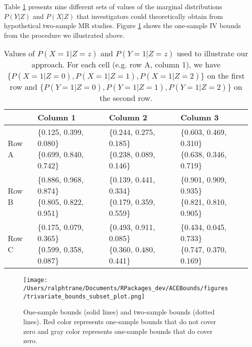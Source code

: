 \documentclass[
]{article}
\theoremstyle{plain}
\begin{document}
Table \ref{tab:subset_plot_summaries} presents nine different sets of values of the marginal distributions \(P(Y | Z)\) and \(P(X | Z)\) that investigators could theoretically obtain from hypothetical two-sample MR studies. Figure \ref{fig:trivariate_bounds} shows the one-sample IV bounds from the procedure we illustrated above.

\begin{table}[H]
  \center
  \caption{Values of $P(X = 1 | Z = z)$ and $P(Y = 1 | Z = z)$ used to illustrate our approach. For each cell (e.g. row A, column 1), we have $\{P(X = 1 | Z = 0), P(X = 1 | Z = 1), P(X = 1 | Z = 2)\}$ on the first row and $\{P(Y = 1 | Z = 0), P(Y = 1 | Z = 1), P(Y = 1 | Z = 2)\}$ on the second row.}
  \label{tab:subset_plot_summaries}
  
\begin{tabular}{llll}
\toprule
  & Column 1 & Column 2 & Column 3\\
\midrule
Row A & \makecell[l]{\{0.125, 0.399, 0.080\}\\\{0.699, 0.840, 0.742\}} & \makecell[c]{\{0.244, 0.275, 0.185\}\\\{0.238, 0.089, 0.146\}} & \makecell[r]{\{0.603, 0.469, 0.310\}\\\{0.638, 0.346, 0.719\}}\\
Row B & \makecell[l]{\{0.886, 0.968, 0.874\}\\\{0.805, 0.822, 0.951\}} & \makecell[c]{\{0.139, 0.441, 0.334\}\\\{0.179, 0.359, 0.559\}} & \makecell[r]{\{0.901, 0.909, 0.935\}\\\{0.821, 0.810, 0.905\}}\\
Row C & \makecell[l]{\{0.175, 0.079, 0.365\}\\\{0.599, 0.358, 0.087\}} & \makecell[c]{\{0.493, 0.911, 0.085\}\\\{0.360, 0.480, 0.441\}} & \makecell[r]{\{0.434, 0.045, 0.733\}\\\{0.747, 0.370, 0.169\}}\\
\bottomrule
\end{tabular}


\end{table}

\begin{figure}[H]
  \center
  \texttt{[image: /Users/ralphtrane/Documents/RPackages\_dev/ACEBounds/figures/trivariate\_bounds\_subset\_plot.png]}
  \caption{One-sample bounds (solid lines) and two-sample bounds (dotted lines). Red color represents one-sample bounds that do not cover zero and gray color represents one-sample bounds that do cover zero.}
  \label{fig:trivariate_bounds}
\end{figure}
\end{document}
